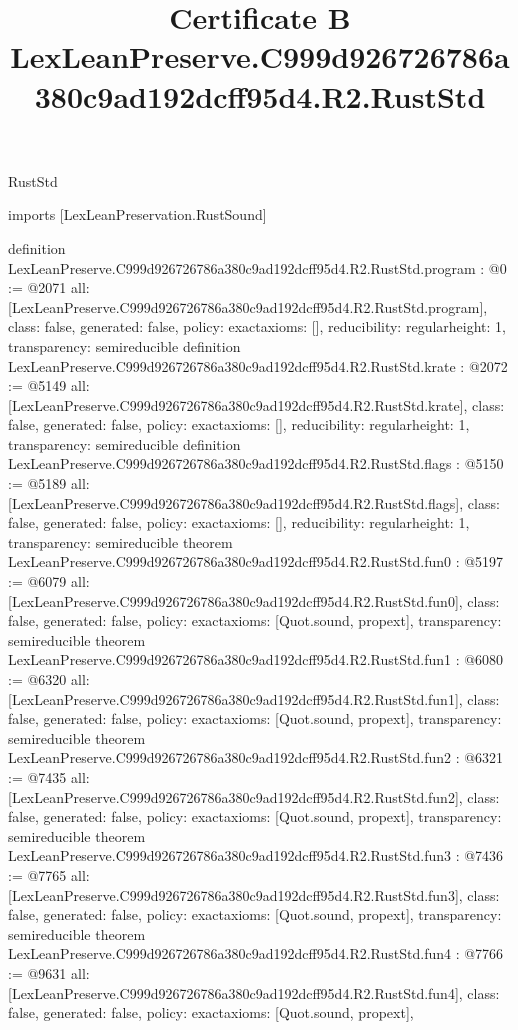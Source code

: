 \begin{lexlean}{RustStd}
\title{Certificate B LexLeanPreserve.C999d926726786a380c9ad192dcff95d4.R2.RustStd}
\begin{coremodule}
imports [LexLeanPreservation.RustSound]

definition LexLeanPreserve.C999d926726786a380c9ad192dcff95d4.R2.RustStd.program : @0 := @2071 {
  all: [LexLeanPreserve.C999d926726786a380c9ad192dcff95d4.R2.RustStd.program],
  class: false,
  generated: false,
  policy: exact{axioms: []},
  reducibility: regular{height: 1},
  transparency: semireducible
}
definition LexLeanPreserve.C999d926726786a380c9ad192dcff95d4.R2.RustStd.krate : @2072 := @5149 {
  all: [LexLeanPreserve.C999d926726786a380c9ad192dcff95d4.R2.RustStd.krate],
  class: false,
  generated: false,
  policy: exact{axioms: []},
  reducibility: regular{height: 1},
  transparency: semireducible
}
definition LexLeanPreserve.C999d926726786a380c9ad192dcff95d4.R2.RustStd.flags : @5150 := @5189 {
  all: [LexLeanPreserve.C999d926726786a380c9ad192dcff95d4.R2.RustStd.flags],
  class: false,
  generated: false,
  policy: exact{axioms: []},
  reducibility: regular{height: 1},
  transparency: semireducible
}
theorem LexLeanPreserve.C999d926726786a380c9ad192dcff95d4.R2.RustStd.fun0 : @5197 := @6079 {
  all: [LexLeanPreserve.C999d926726786a380c9ad192dcff95d4.R2.RustStd.fun0],
  class: false,
  generated: false,
  policy: exact{axioms: [Quot.sound, propext]},
  transparency: semireducible
}
theorem LexLeanPreserve.C999d926726786a380c9ad192dcff95d4.R2.RustStd.fun1 : @6080 := @6320 {
  all: [LexLeanPreserve.C999d926726786a380c9ad192dcff95d4.R2.RustStd.fun1],
  class: false,
  generated: false,
  policy: exact{axioms: [Quot.sound, propext]},
  transparency: semireducible
}
theorem LexLeanPreserve.C999d926726786a380c9ad192dcff95d4.R2.RustStd.fun2 : @6321 := @7435 {
  all: [LexLeanPreserve.C999d926726786a380c9ad192dcff95d4.R2.RustStd.fun2],
  class: false,
  generated: false,
  policy: exact{axioms: [Quot.sound, propext]},
  transparency: semireducible
}
theorem LexLeanPreserve.C999d926726786a380c9ad192dcff95d4.R2.RustStd.fun3 : @7436 := @7765 {
  all: [LexLeanPreserve.C999d926726786a380c9ad192dcff95d4.R2.RustStd.fun3],
  class: false,
  generated: false,
  policy: exact{axioms: [Quot.sound, propext]},
  transparency: semireducible
}
theorem LexLeanPreserve.C999d926726786a380c9ad192dcff95d4.R2.RustStd.fun4 : @7766 := @9631 {
  all: [LexLeanPreserve.C999d926726786a380c9ad192dcff95d4.R2.RustStd.fun4],
  class: false,
  generated: false,
  policy: exact{axioms: [Quot.sound, propext]},
}
\end{coremodule}
\end{lexlean}
